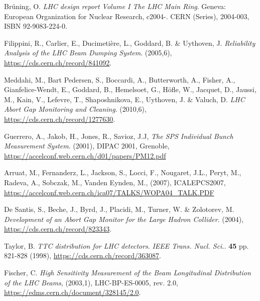 %
{\printbibliography}{

    \begin{thebibliography}{99}
	
         Br\"uning, O. \emph{LHC design report Volume I The LHC
            Main Ring}. Geneva: European Organization for Nuclear Research, c2004-. CERN
            (Series), 2004-003, ISBN 92-9083-224-0.

         Filippini, R., Carlier, E., Ducimetière, L., Goddard,
            B. \& Uythoven, J. \emph{Reliability Analysis of the LHC Beam Dumping System}.
            (2005,6), \url{https://cds.cern.ch/record/841092}.

        Meddahi, M., Bart Pedersen, S., Boccardi, A.,
            Butterworth, A., Fisher, A., Gianfelice-Wendt, E., Goddard, B., Hemelsoet,
            G., Höfle, W., Jacquet, D., Jaussi, M., Kain, V., Lefevre, T., Shaposhnikova,
            E., Uythoven, J. \& Valuch, D. \emph{LHC Abort Gap Monitoring and Cleaning}.
            (2010,6), \url{https://cds.cern.ch/record/1277630}.

         Guerrero, A., Jakob, H., Jones, R., Savioz, J.J,
        \emph{The SPS Individual Bunch Measurement System}. (2001), DIPAC 2001, Grenoble, \url{https://accelconf.web.cern.ch/d01/papers/PM12.pdf}

         Arruat, M., Fernanderz, L., Jackson, S., Locci, F., Nougaret, J.L., Peryt, M., Radeva, A., Sobczak, M., Vanden Eynden, M., (2007), ICALEPCS2007, \url{https://accelconf.web.cern.ch/ica07/TALKS/WOPA04_TALK.PDF}
        
        De Santis, S., Beche, J., Byrd, J., Placidi, M.,
            Turner, W. \& Zolotorev, M. \emph{Development of an Abort Gap Monitor for the
            Large Hadron Collider}.  (2004), \url{https://cds.cern.ch/record/823343}.

         Taylor, B. \emph{TTC distribution for LHC detectors}.
            {\em IEEE Trans. Nucl. Sci.}. \textbf{45} pp. 821-828 (1998),
            \url{https://cds.cern.ch/record/363087}.

         Fischer, C.  \emph{High Sensitivity
            Measurement of the Beam Longitudinal Distribution of the LHC Beams}, 
            (2003,1), LHC-BP-ES-0005, rev. 2.0,
            \url{https://edms.cern.ch/document/328145/2.0}.


\end{thebibliography}}
